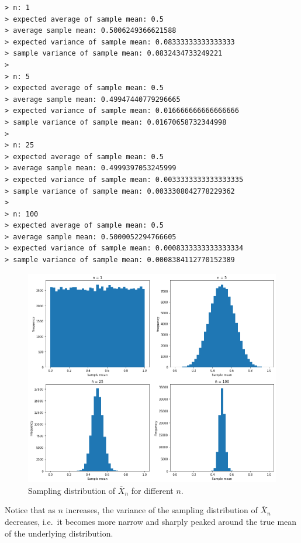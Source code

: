 \begin{ex}
  \inputminted{python}{src/03-19d.py}

  \begin{verbatim}
> n: 1
> expected average of sample mean: 0.5
> average sample mean: 0.5006249366621588
> expected variance of sample mean: 0.08333333333333333
> sample variance of sample mean: 0.0832434733249221
> 
> n: 5
> expected average of sample mean: 0.5
> average sample mean: 0.49947440779296665
> expected variance of sample mean: 0.016666666666666666
> sample variance of sample mean: 0.01670658732344998
> 
> n: 25
> expected average of sample mean: 0.5
> average sample mean: 0.4999397053245999
> expected variance of sample mean: 0.0033333333333333335
> sample variance of sample mean: 0.0033308042778229362
> 
> n: 100
> expected average of sample mean: 0.5
> average sample mean: 0.5000052294766605
> expected variance of sample mean: 0.0008333333333333334
> sample variance of sample mean: 0.0008384112770152389
\end{verbatim}

  \begin{figure}[H]
    \centering
    \includegraphics[scale=0.535]{part1/ch03-19d}
    \caption{Sampling distribution of $\overline{X}_n$ for different $n$.}
  \end{figure}

  Notice that as $n$ increases, the variance of the sampling distribution of
  $\overline{X}_n$ decreases, i.e.\ it becomes more narrow and sharply peaked
  around the true mean of the underlying distribution.
\end{ex}

